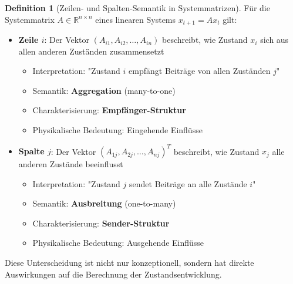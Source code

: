 \documentclass[a4paper,12pt]{report}
\theoremstyle{definition}
\newtheorem{definition}{Definition}
\begin{document}
	\begin{definition}[Zeilen- und Spalten-Semantik in Systemmatrizen]
		Für die Systemmatrix $A \in \mathbb{R}^{n \times n}$ eines linearen Systems $x_{t+1} = Ax_t$ gilt:
		\begin{itemize}
			\item \textbf{Zeile $i$}: Der Vektor $(A_{i1}, A_{i2}, \ldots, A_{in})$ beschreibt, wie Zustand $x_i$ sich aus allen anderen Zuständen zusammensetzt
			\begin{itemize}
				\item Interpretation: "Zustand $i$ empfängt Beiträge von allen Zuständen $j$"
				\item Semantik: \textbf{Aggregation} (many-to-one)
				\item Charakterisierung: \textbf{Empfänger-Struktur}
				\item Physikalische Bedeutung: Eingehende Einflüsse
			\end{itemize}
			\item \textbf{Spalte $j$}: Der Vektor $(A_{1j}, A_{2j}, \ldots, A_{nj})^T$ beschreibt, wie Zustand $x_j$ alle anderen Zustände beeinflusst
			\begin{itemize}
				\item Interpretation: "Zustand $j$ sendet Beiträge an alle Zustände $i$"
				\item Semantik: \textbf{Ausbreitung} (one-to-many)
				\item Charakterisierung: \textbf{Sender-Struktur}
				\item Physikalische Bedeutung: Ausgehende Einflüsse
			\end{itemize}
		\end{itemize}
	\end{definition}
	
	Diese Unterscheidung ist nicht nur konzeptionell, sondern hat direkte Auswirkungen auf die Berechnung der Zustandsentwicklung.
	
\end{document}

